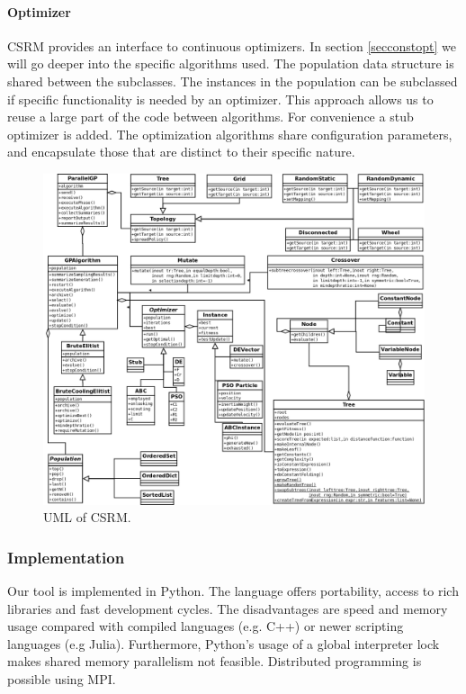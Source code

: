 \paragraph{Optimizer}
CSRM provides an interface to continuous optimizers. In section \ref{secconstopt} we will go deeper into the specific algorithms used. The population data structure is shared between the subclasses. The instances in the population can be subclassed if specific functionality is needed by an optimizer. This approach allows us to reuse a large part of the code between algorithms. For convenience a stub optimizer is added. The optimization algorithms share configuration parameters, and encapsulate those that are distinct to their specific nature.
\begin{figure}
    \centering
    \includegraphics[width=\textwidth,height=\textheight,keepaspectratio]{figures/umldistributed.png}
    \caption{UML of CSRM.}
    \label{fig:uml}
\end{figure}


\subsubsection{Implementation}
Our tool is implemented in Python. The language offers portability, access to rich libraries and fast development cycles. The disadvantages are speed and memory usage compared with compiled languages (e.g. C++) or newer scripting languages (e.g Julia). %
Furthermore, Python's usage of a global interpreter lock makes shared memory parallelism not feasible. Distributed programming is possible using MPI.

